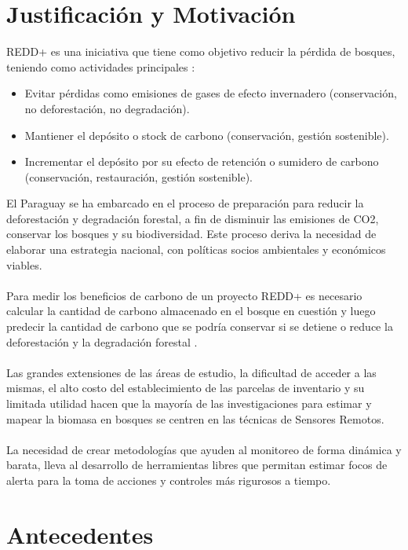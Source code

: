 \section{Justificación y Motivación}

REDD+ es una iniciativa que tiene como objetivo reducir la p\'erdida de bosques, teniendo como actividades principales \cite{peralta2013analisis}:
\begin{itemize}
	\item Evitar p\'erdidas como emisiones de gases de efecto invernadero (conservaci\'on, no deforestaci\'on, no degradaci\'on).
	\item Mantiener el dep\'osito o stock de carbono (conservaci\'on, gesti\'on sostenible).
	\item Incrementar el dep\'osito por su efecto de retenci\'on o sumidero de carbono (conservaci\'on, restauraci\'on, gesti\'on sostenible).
\end{itemize}

El Paraguay se ha embarcado en el proceso de preparaci\'on para reducir la deforestaci\'on y degradaci\'on forestal, a fin de disminuir las emisiones de CO2, conservar los bosques y su biodiversidad. Este proceso deriva la necesidad de elaborar una estrategia nacional, con pol\'iticas socios ambientales y econ\'omicos viables.\\~\\
Para medir los beneficios de carbono de un proyecto REDD+ es necesario calcular la cantidad de carbono almacenado en el bosque en cuesti\'on y luego predecir la cantidad de carbono que se podr\'ia conservar si se detiene o reduce la deforestaci\'on y la degradaci\'on forestal \cite{nellemann2009carbono}.\\~\\
Las grandes extensiones de las \'areas de estudio, la dificultad de acceder a las mismas, el alto costo del establecimiento de las parcelas de inventario y su limitada utilidad hacen que la mayoría de las investigaciones para estimar y mapear la biomasa en bosques se centren en las t\'ecnicas de Sensores Remotos. \\~\\
La necesidad de crear metodolog\'ias que ayuden al monitoreo de forma din\'amica y barata, lleva al desarrollo de herramientas libres que permitan estimar focos de alerta para la toma de acciones y controles m\'as rigurosos a tiempo.


\section{Antecedentes}

